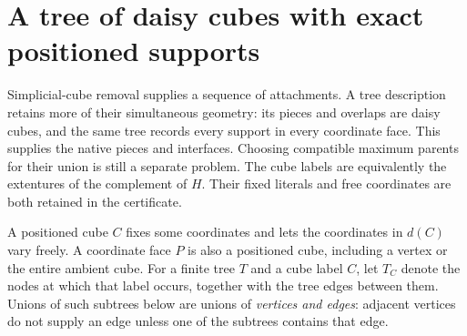 \section{A tree of daisy cubes with exact positioned supports}
\label{sec:maxmin-chordal-downset-tree}

Simplicial-cube removal supplies a sequence of attachments. A tree description
retains more of their simultaneous geometry: its pieces and overlaps are
daisy cubes, and the same tree records every support in every
coordinate face. This supplies the native pieces and interfaces. Choosing
compatible maximum parents for their union is still a separate problem.
The cube labels are equivalently the extentures of the complement of $H$.
Their fixed literals and free coordinates are both retained in the certificate.

A positioned cube $C$ fixes some coordinates and lets the coordinates in
$d(C)$ vary freely. A coordinate face $P$ is also a positioned cube, including
a vertex or the entire ambient cube. For a finite tree $T$ and a cube label
$C$, let $T_C$ denote the nodes at which that label occurs, together with
the tree edges between them. Unions of such subtrees below are unions of
\emph{vertices and edges}: adjacent vertices do not supply an edge unless
one of the subtrees contains that edge.

